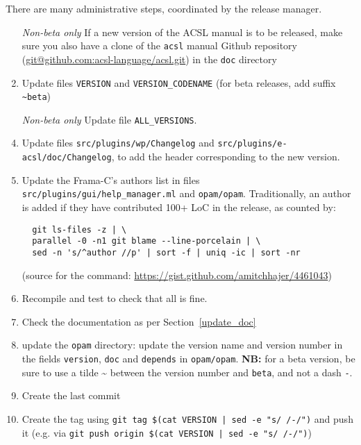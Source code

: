 There are many administrative steps, coordinated by the release manager.
\begin{enumerate}
\item [{\em Non-beta only}] If a new version of the ACSL manual is to be released, make sure you also
  have a clone of the \texttt{acsl} manual Github repository
  (\url{git@github.com:acsl-language/acsl.git}) in the \texttt{doc}
  directory
\item Update files \texttt{VERSION} and \texttt{VERSION\_CODENAME}
  (for beta releases, add suffix \texttt{\textasciitilde{}beta})
\item [{\em Non-beta only}] Update file \texttt{ALL\_VERSIONS}. 
\item Update files
  \texttt{src/plugins/wp/Changelog} and
  \texttt{src/plugins/e-acsl/doc/Changelog},
  to add the header corresponding to the
  new version. %
\item Update the Frama-C's authors list in files
  \texttt{src/plugins/gui/help\_manager.ml} and \texttt{opam/opam}.
  Traditionally, an author is added if they have contributed 100+ LoC in
  the release, as counted by:
  \begin{verbatim}
  git ls-files -z | \
  parallel -0 -n1 git blame --line-porcelain | \
  sed -n 's/^author //p' | sort -f | uniq -ic | sort -nr
  \end{verbatim}
  (source for the command: \url{https://gist.github.com/amitchhajer/4461043})
\item Recompile and test to check that all is fine.
\item Check the documentation as per Section~\ref{update_doc}
\item update the \texttt{opam} directory: update the version name and
  version number in the fields \texttt{version}, \texttt{doc} and
  \texttt{depends} in \texttt{opam/opam}. \textbf{NB:} for a beta version, be sure
  to use a tilde \textasciitilde{} between the version number and \texttt{beta},
  and not a dash \texttt{-}.
\item Create the last commit
\item Create the tag using \texttt{git tag \$(cat VERSION | sed -e "s/~/-/")} and push it (e.g. via \texttt{git push origin \$(cat VERSION | sed -e "s/~/-/")})
\end{enumerate}

